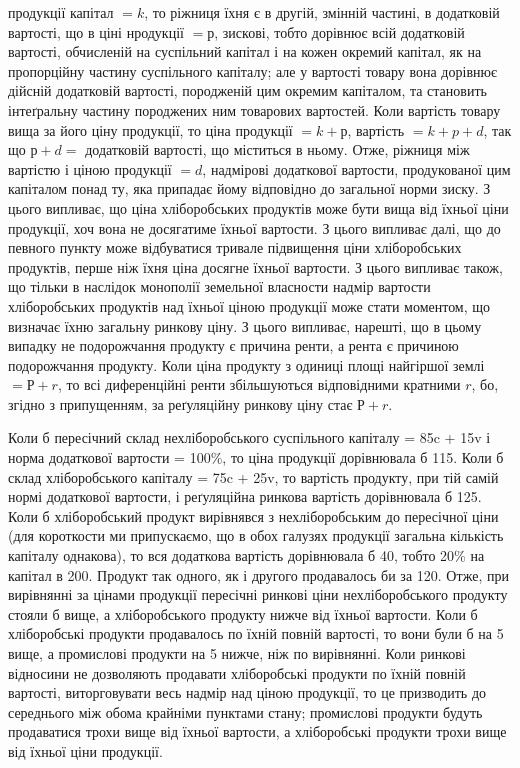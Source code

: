 \parcont{}  %
продукції капітал $= k$, то ріжниця їхня є в другій, змінній частині, в додатковій
вартості, що в ціні нродукції $= р$, зискові, тобто дорівнює всій додатковій
вартості, обчисленій на суспільний капітал і на кожен окремий капітал, як на
пропорційну частину суспільного капіталу; але у вартості товару вона дорівнює
дійсній додатковій вартості, породженій цим окремим капіталом, та становить
інтеґральну частину породжених ним товарових вартостей. Коли вартість товару
вища за його ціну продукції, то ціна продукції $= k + р$, вартість $= k + p + d$,
так що $р + d =$ додатковій вартості, що міститься в ньому. Отже, ріжниця між
вартістю і ціною продукції $= d$, надмірові додаткової вартости, продукованої цим
капіталом понад ту, яка припадає йому відповідно до загальної норми зиску.
З цього випливає, що ціна хліборобських продуктів може бути вища від їхньої
ціни продукції, хоч вона не досягатиме їхньої вартости. З цього випливає
далі, що до певного пункту може відбуватися тривале підвищення ціни
хліборобських продуктів, перше ніж їхня ціна досягне їхньої вартости. З цього
випливає також, що тільки в наслідок монополії земельної власности надмір
вартости хліборобських продуктів над їхньої ціною продукції може стати моментом,
що визначає їхню загальну ринкову ціну. З цього випливає, нарешті,
що в цьому випадку не подорожчання продукту є причина ренти, а рента
є причиною подорожчання продукту. Коли ціна продукту з одиниці площі найгіршої
землі $= Р + r$, то всі диференційні ренти збільшуються відповідними кратними
$r$, бо, згідно з припущенням, за реґуляційну ринкову ціну стає $Р + r$.

Коли б пересічний склад нехліборобського суспільного капіталу =
85c + 15v і норма додаткової вартости = 100\%, то ціна продукції дорівнювала
б 115. Коли б склад хліборобського капіталу = 75c + 25v, то вартість
продукту, при тій самій нормі додаткової вартости, і реґуляційна ринкова
вартість дорівнювала б 125. Коли б хліборобський продукт вирівнявся з нехліборобським
до пересічної ціни (для короткости ми припускаємо, що в обох галузях
продукції загальна кількість капіталу однакова), то вся додаткова вартість
дорівнювала б 40, тобто 20\% на капітал в 200. Продукт так одного, як і другого
продавалось би за 120. Отже, при вирівнянні за цінами продукції пересічні ринкові
ціни нехліборобського продукту стояли б вище, а хліборобського продукту
нижче від їхньої вартости. Коли б хліборобські продукти продавалось по їхній
повній вартості, то вони були б на 5 вище, а промислові продукти
на 5 нижче, ніж по вирівнянні. Коли ринкові відносини не дозволяють продавати
хліборобські продукти по їхній повній вартості, виторговувати весь надмір
над ціною продукції, то це призводить до середнього між обома крайніми
пунктами стану; промислові продукти будуть продаватися трохи вище від їхньої
вартости, а хліборобські продукти трохи вище від їхньої ціни продукції.

